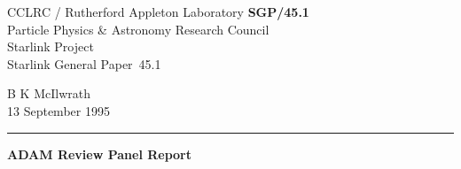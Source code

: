 \documentclass[twoside,11pt]{article}
\newcommand{\stardoccategory}  {Starlink General Paper}
\newcommand{\stardocinitials}  {SGP}
\newcommand{\stardocnumber}    {45.1}
\newcommand{\stardocauthors}   {B K McIlwrath}
\newcommand{\stardocdate}      {13 September 1995}
\newcommand{\stardoctitle}     {ADAM Review Panel Report}
\newcommand{\stardocname}{\stardocinitials /\stardocnumber}
\newenvironment{latexonly}{}{}
\begin{document}
\thispagestyle{empty}

\begin{latexonly}
   CCLRC / {\sc Rutherford Appleton Laboratory} \hfill {\bf \stardocname}\\
   {\large Particle Physics \& Astronomy Research Council}\\
   {\large Starlink Project\\}
   {\large \stardoccategory\ \stardocnumber}
   \begin{flushright}
   \stardocauthors\\
   \stardocdate
   \end{flushright}
   \vspace{-4mm}
   \rule{\textwidth}{0.5mm}
   \vspace{5mm}
   \begin{center}
   {\Large\bf \stardoctitle}
   \end{center}
   \vspace{5mm}

\end{latexonly}
\end{document}
